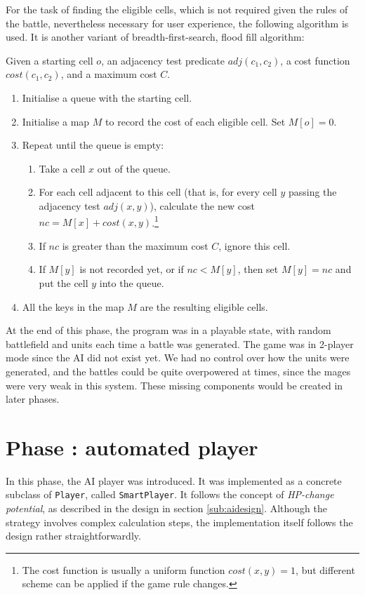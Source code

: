 For the task of finding the eligible cells, which is not required given the rules of the battle, nevertheless necessary for user experience, the following algorithm is used. It is another variant of breadth-first-search, flood fill algorithm:

Given a starting cell $o$, an adjacency test predicate $adj(c_1, c_2)$, a cost function $cost(c_1, c_2)$, and a maximum cost $C$. 
\begin{enumerate}
	\item Initialise a queue with the starting cell.
	\item Initialise a map $M$ to record the cost of each eligible cell. Set $M[o] = 0$.
	\item Repeat until the queue is empty:
	\begin{enumerate}
		\item Take a cell $x$ out of the queue.
		\item For each cell adjacent to this cell (that is, for every cell $y$ passing the adjacency test $adj(x, y)$), calculate the new cost $nc = M[x] + cost(x, y)$.\footnote{The cost function is usually a uniform function $cost(x, y) = 1$, but different scheme can be applied if the game rule changes.}
		\item If $nc$ is greater than the maximum cost $C$, ignore this cell.
		\item If $M[y]$ is not recorded yet, or if $nc < M[y]$, then set $M[y] = nc$ and put the cell $y$ into the queue. 
	\end{enumerate}
	\item All the keys in the map $M$ are the resulting eligible cells.
\end{enumerate}

\bigskip
At the end of this phase, the program was in a playable state, with random battlefield and units each time a battle was generated. The game was in 2-player mode since the AI did not exist yet. We had no control over how the units were generated, and the battles could be quite overpowered at times, since the mages were very weak in this system. These missing components would be created in later phases.

\section{Phase : automated player}

In this phase, the AI player was introduced. It was implemented as a concrete subclass of \texttt{Player}, called \texttt{SmartPlayer}. It follows the concept of \textit{HP-change potential}, as described in the design in section \ref{sub:aidesign}. Although the strategy involves complex calculation steps, the implementation itself follows the design rather straightforwardly. 

